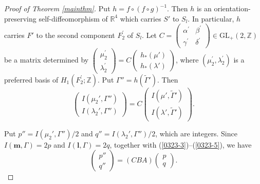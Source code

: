 \documentclass[a4paper,11pt]{amsart}
\numberwithin{equation}{section}
\begin{document}
\begin{proof}[Proof of Theorem \ref{mainthm}]
\begin{sloppypar}
Put $h=f \circ (f\circ g)^{-1}$. Then $h$ is an orientation-preserving self-diffeomorphism of $\mathbb{R}^4$ which carries $S'$ to $S_l$. In particular, $h$ carries $F'$ to the second component $F_2^\prime$ of $S_l$. 
Let $C=\begin{pmatrix} \alpha^\prime & \beta^\prime \\
\gamma^\prime & \delta^\prime \end{pmatrix} \in \mathrm{GL}_+(2, \mathbb{Z})$ be a matrix determined by  $\begin{pmatrix} \mu_2^\prime \\ \lambda_2^\prime \end{pmatrix}=C \begin{pmatrix} h_*(\mu') \\ h_*(\lambda') \end{pmatrix}$, where $(\mu_2^\prime, \lambda_2^\prime)$ is a preferred basis of $H_1(F_2^\prime; \mathbb{Z})$. Put $\Gamma''=h(\widetilde{\Gamma}')$. Then 
\begin{equation}\label{0323-5}
\begin{pmatrix} I(\mu_2', \Gamma'') \\ I(\lambda_2', \Gamma'') \end{pmatrix}=C\begin{pmatrix} I(\mu', \widetilde{\Gamma}') \\ I(\lambda', \widetilde{\Gamma}')\end{pmatrix}.
\end{equation}

Put $p''=I(\mu_2', \Gamma'')/2$ and $q''=I(\lambda_2', \Gamma'')/2$, which are integers. Since $I(\mathbf{m}, \Gamma)=2p$ and $I(\mathbf{l}, \Gamma)=2q$, 
together with (\ref{0323-3})--(\ref{0323-5}), we have 
\begin{equation}\label{0323-6}
\begin{pmatrix}p''\\ q''\end{pmatrix}=(CBA)\begin{pmatrix} p\\q \end{pmatrix}.
\end{equation}


\end{sloppypar}
\end{proof}
\end{document}
